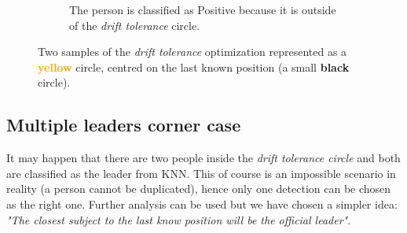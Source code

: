 \begin{figure}[!h]
\begin{subfigure}[!h]{0.39\textwidth}
		\caption{The person is classified as Positive because it is outside of the \textit{drift tolerance} circle.}
		\label{fig:driftOptimizationOk}
	\end{subfigure}
	\captionsetup{margin=1.4cm}
	\caption[Two samples of the \textit{drift tolerance} optimization.]{Two samples of the \textit{drift tolerance} optimization represented as a \textbf{\textcolor{orange}{yellow}} circle, centred on the last known position (a small \textbf{black} circle).}
	\label{fig:driftOptimization}
\end{figure}

\subsection{Multiple leaders corner case} \label{sec:multipleleaders}
It may happen that there are two people inside the \textit{drift tolerance circle} and both are classified as the leader from KNN. This of course is an impossible scenario in reality (a person cannot be duplicated), hence only one detection can be chosen as the right one. Further analysis can be used but we have chosen a simpler idea: \textit{"The closest subject to the last know position will be the official leader"}.

